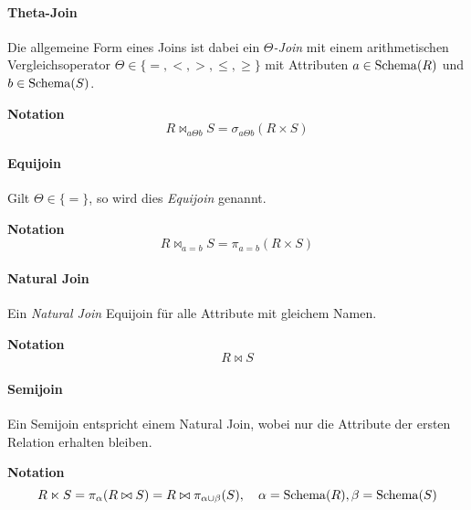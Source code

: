                 \paragraph{Theta-Join} %
                    Die allgemeine Form eines Joins ist dabei ein \textit{\(\Theta\)-Join} mit einem arithmetischen Vergleichsoperator \( \Theta \in \{ =, <, >, \leq, \geq \} \) mit Attributen \( a \in \operatorname{Schema}(R) \) und \( b \in \operatorname{Schema}(S) \).
                    
                    \textbf{Notation}
                    \begin{equation*}
                        R \bowtie _ { a \Theta b } S = \sigma _ { a \Theta b } (R \times S)
                    \end{equation*}

                \paragraph{Equijoin} %
                    Gilt \( \Theta \in \{=\} \), so wird dies \textit{Equijoin} genannt.
                    
                    \textbf{Notation}
                    \begin{equation*}
                        R \bowtie _ { a = b } S = \pi _ { a = b } (R \times S)
                    \end{equation*}

                \paragraph{Natural Join} %
                    Ein \textit{Natural Join} Equijoin für alle Attribute mit gleichem Namen.
                    
                    \textbf{Notation}
                    \begin{equation*}
                        R \bowtie S
                    \end{equation*}

                \paragraph{Semijoin} %
                    Ein Semijoin entspricht einem Natural Join, wobei nur die Attribute der ersten Relation erhalten bleiben.
                    
                    \textbf{Notation}
                    \begin{equation*}
                    	R \ltimes S = \pi_\alpha(R \bowtie S) = R \bowtie \pi_{\alpha \cup \beta} (S), \quad \alpha = \operatorname{Schema}(R), \beta = \operatorname{Schema}(S)
                    \end{equation*}

